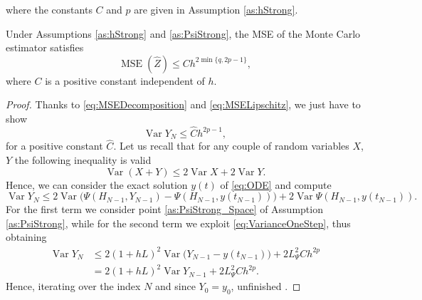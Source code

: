 \documentclass{siamart1116}
\numberwithin{theorem}{section}
\newcommand{\Var}{\operatorname{Var}}
\newcommand{\MSE}{\operatorname{MSE}}
\begin{document}
where the constants $C$ and $p$ are given in Assumption \ref{as:hStrong}.
\begin{theorem}\label{thm:MSEMonteCarlo} Under Assumptions \ref{as:hStrong} and \ref{as:PsiStrong}, the MSE of the Monte Carlo estimator satisfies
	\begin{equation}
		\MSE(\hat Z) \leq C h^{2\min\{q, 2p -1\}},
	\end{equation}
	where $C$ is a positive constant independent of $h$.
\end{theorem}
\begin{proof} Thanks to \eqref{eq:MSEDecomposition} and \eqref{eq:MSELipschitz}, we just have to show
	\begin{equation}
		\Var Y_N \leq \hat C h^{2p - 1},
	\end{equation}
	for a positive constant $\hat C$. Let us recall that for any couple of random variables $X$, $Y$ the following inequality is valid
	\begin{equation}
		\Var(X + Y) \leq 2\Var X + 2 \Var Y.
	\end{equation}
	Hence, we can consider the exact solution $y(t)$ of \eqref{eq:ODE} and compute
	\begin{equation}
		\Var Y_N \leq 2 \Var\big(\Psi(H_{N-1}, Y_{N-1}) - \Psi(H_{N-1}, y(t_{N-1}))\big) + 2 \Var \Psi(H_{N-1}, y(t_{N-1})).
	\end{equation}
	For the first term we consider point \ref{as:PsiStrong_Space} of Assumption \ref{as:PsiStrong}, while for the second term we exploit \eqref{eq:VarianceOneStep}, thus obtaining
	\begin{equation}
	\begin{aligned}
		\Var Y_N &\leq 2(1 + hL)^2 \Var\big(Y_{N-1} - y(t_{N-1})\big) + 2 L_\Psi^2 C h^{2p}\\
		&= 2(1 + hL)^2 \Var Y_{N-1} + 2 L_\Psi^2 C h^{2p}.
	\end{aligned}
	\end{equation}
	Hence, iterating over the index $N$ and since $Y_0 = y_0$, \color{red} unfinished \color{black}.
\end{proof}
\end{document}
